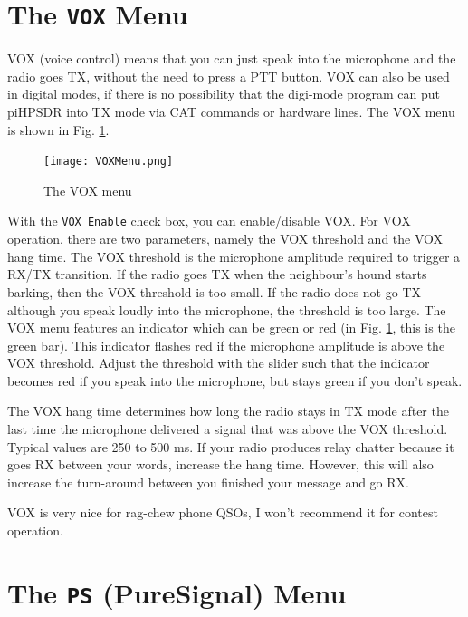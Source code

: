\documentclass[12pt]{book}
\def\rett#1{\texttt{\color{red}#1}}
\def\pH{pi\-HPSDR\xspace}
\begin{document}
\section{The \texttt{VOX} Menu}

VOX (voice control) means that you can just speak into the microphone and the
radio goes TX, without the need to press a PTT button. VOX can also be used
in digital modes, if there is no possibility that the digi-mode program can
put \pH into TX mode via CAT commands or hardware lines. The VOX menu
is shown in Fig. \ref{fig:VOXMenu}.

\begin{figure}[ht]
\center
\texttt{[image: VOXMenu.png]}
\caption{The VOX menu}
\label{fig:VOXMenu}
\end{figure}

With the \rett{VOX Enable} check box, you can enable/disable VOX. For VOX operation,
there are two parameters, namely the VOX threshold and the VOX hang time. The VOX threshold
is the microphone amplitude required to trigger a RX/TX transition. If the radio goes TX
when the neighbour's hound starts barking, then the VOX threshold is too small. If the radio
does not go TX  although you speak loudly into the microphone, the threshold is too large.
The VOX menu features an indicator which can be green or red (in Fig. \ref{fig:VOXMenu}, this
is the green bar). This indicator flashes red if the microphone amplitude is above the VOX
threshold. Adjust the threshold with the slider such that the indicator becomes red if  you
speak into the microphone, but stays green if you don't speak.

The VOX hang time determines how long the radio stays in TX mode after the last time the
microphone delivered a signal that was above the VOX threshold. Typical values are 250 to
500 ms. If your radio produces relay chatter because it goes RX between your words,
increase the hang time. However, this will also increase the turn-around between you finished
your message and go RX.

VOX is very nice for rag-chew phone QSOs, I won't recommend it for contest operation.

\section{The \texttt{PS} (PureSignal) Menu}
\end{document}
